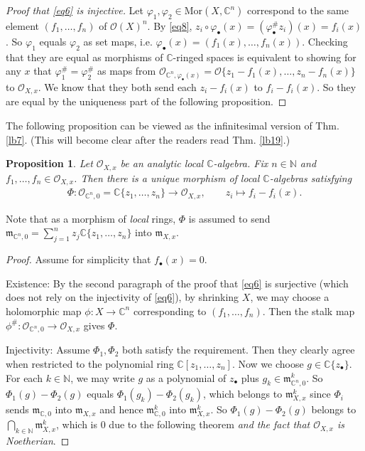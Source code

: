 \documentclass[12pt,b5paper,notitlepage]{report}
\theoremstyle{definition}
\theoremstyle{plain}
\newtheorem{pp}[df]{Proposition}
\newcommand{\fk}{\mathfrak}
\newcommand{\scr}{\mathscr}
\newcommand{\blt}{\bullet}
\newcommand{\Cbb}{\mathbb C}
\newcommand{\Nbb}{\mathbb N}
\newcommand{\Mor}{\mathrm{Mor}}
\numberwithin{equation}{section}
\begin{document}
\begin{proof}[Proof that \eqref{eq6} is injective]
Let $\varphi_1,\varphi_2\in\Mor(X,\Cbb^n)$ correspond to the same element $(f_1,\dots,f_n)$ of $\scr O(X)^n$. By \eqref{eq8}, $z_i\circ\varphi_\blt(x)=(\varphi_\blt^\# z_i)(x)=f_i(x)$. So $\varphi_1$ equals $\varphi_2$ as set maps, i.e. $\varphi_\blt(x)=(f_1(x),\dots,f_n(x))$. Checking that they are equal as morphisms of $\Cbb$-ringed spaces is equivalent to showing for any $x$ that $\varphi_1^\#=\varphi_2^\#$ as maps from $\scr O_{\Cbb^n,\varphi_\blt(x)}=\scr O\{z_1-f_1(x),\dots,z_n-f_n(x)\}$ to $\scr O_{X,x}$. We know that they both send each $z_i-f_i(x)$ to $f_i-f_i(x)$. So they are equal by the uniqueness part of the following proposition.
\end{proof}

The following proposition can be viewed as the infinitesimal version of Thm. \ref{lb7}. (This will become clear after the readers read Thm. \ref{lb19}.)

\begin{pp}\label{lb8}
Let $\scr O_{X,x}$ be an analytic local $\Cbb$-algebra. Fix $n\in\Nbb$ and $f_1,\dots,f_n\in\scr O_{X,x}$. Then there is a unique morphism of local $\Cbb$-algebras satisfying
\begin{align}
\Phi:\scr O_{\Cbb^n,0}=\Cbb\{z_1,\dots,z_n\}\rightarrow \scr O_{X,x},\qquad z_i\mapsto f_i-f_i(x).
\end{align}
\end{pp}

Note that as a morphism of \emph{local} rings, $\Phi$ is assumed to send $\fk m_{\Cbb^n,0}=\sum_{j=1}^n z_j\Cbb\{z_1,\dots,z_n\}$ into $\fk m_{X,x}$.



\begin{proof}
Assume for simplicity that $f_\blt(x)=0$.

Existence: By the second paragraph of the proof that \eqref{eq6} is surjective (which does not rely on the injectivity of \eqref{eq6}), by shrinking $X$, we may choose a holomorphic map $\phi:X\rightarrow\Cbb^n$ corresponding to $(f_1,\dots,f_n)$. Then the stalk map $\phi^\#:\scr O_{\Cbb^n,0}\rightarrow\scr O_{X,x}$ gives $\Phi$.

Injectivity: Assume $\Phi_1,\Phi_2$ both satisfy the requirement. Then they clearly agree when restricted to the polynomial ring $\Cbb[z_1,\dots,z_n]$. Now we choose $g\in\Cbb\{z_\blt\}$. For each $k\in\Nbb$, we may write $g$ as a polynomial of $z_\blt$ plus $g_k\in\fk m_{\Cbb^n,0}^k$. So $\Phi_1(g)-\Phi_2(g)$ equals $\Phi_1(g_k)-\Phi_2(g_k)$, which belongs to $\fk m_{X,x}^k$ since  $\Phi_i$  sends $\fk m_{\Cbb,0}$ into $\fk m_{X,x}$ and hence $\fk m_{\Cbb,0}^k$ into $\fk m_{X,x}^k$. So $\Phi_1(g)-\Phi_2(g)$ belongs to $\bigcap_{k\in\Nbb}\fk m_{X,x}^k$, which is $0$ due to the following theorem \emph{and the fact that $\scr O_{X,x}$ is Noetherian}.
\end{proof}
\end{document}
